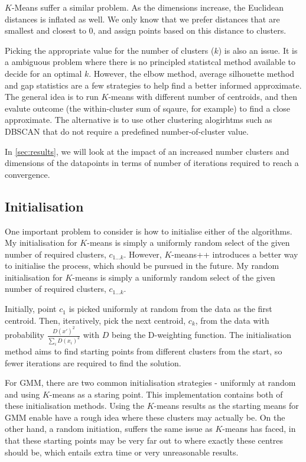 \documentclass[11pt,openright,a4paper]{article}
\numberwithin{equation}{section}
\begin{document}
$K$-Means suffer a similar problem. As the dimensions increase, the Euclidean distances is inflated as well. We only know that we prefer distances that are smallest and closest to 0, and assign points based on this distance to clusters.

Picking the appropriate value for the number of clusters ($k$) is also an issue. It is a ambiguous problem where there is no principled statistcal method available to decide for an optimal $k$. However, the elbow method, average silhouette method and gap statistics are a few strategies to help find a better informed approximate. The general idea is to run $K$-means with different number of centroids, and then evalute outcome (the within-cluster sum of sqaure, for example) to find a close approximate. The alternative is to use other clustering alogirhtms such as DBSCAN that do not require a predefined number-of-cluster value.


In \autoref{sec:results}, we will look at the impact of an increased number clusters and dimensions of the datapoints in terms of number of iterations required to reach a convergence.

\subsection{Initialisation} \label{ssec:dis-init}
One important problem to consider is how to initialise either of the algorithms. My initialisation for $K$-means is simply a uniformly random select of the given number of required clusters, $c_{1...k}$.  However, $K$-means++ \cite{kmeans-pp} introduces a better way to initialise the process, which should be pursued in the future. 
My random initialisation for $K$-means is simply a uniformly random select of the given number of required clusters, $c_{1...k}$.

Initially, point $c_1$ is picked uniformly at random from the data as the first centroid. Then, iteratively, pick the next centroid, $c_k$, from the data with probability $\frac{D(x')^2}{\sum_{i} D(x_i)^2}$ with $D$ being the D-weighting function. The initialisation method aims to find starting points from different clusters from the start, so fewer iterations are required to find the solution.

For GMM, there are two common initialisation strategies - uniformly at random and using $K$-means as a staring point. This implementation contains both of these initialisation methods. Using the $K$-means results as the starting means for GMM enable have a rough idea where these clusters may actually be. On the other hand, a random initiation, suffers the same issue as $K$-means has faced, in that these starting points may be very far out to where exactly these centres should be, which entails extra time or very unreasonable results. 
\end{document}
